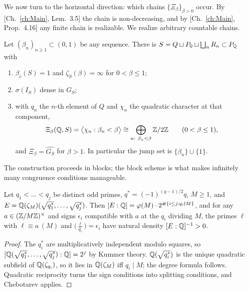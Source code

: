 We now turn to the horizontal direction: which chains $\{\Xi_\beta\}_{\beta>0}$ occur. By
[Ch.~\ref{ch:Main}, Lem.~3.5] the chain is non-decreasing, and by [Ch.~\ref{ch:Main}, Prop.~4.16] any
finite chain is realizable. We realize arbitrary countable chains.

\begin{theorem}[Realization]\label{I:thm:realize}
Let $(\beta_n)_{n\ge1}\subset(0,1)$ be any sequence. There is $S=Q\sqcup P_0\sqcup\bigsqcup_nR_n\subset P_{\mathbb{Q}}$
with
\begin{enumerate}
\item $\beta_c(S)=1$ and $\zeta_S(\beta)=\infty$ for $0<\beta\le1$;
\item $\sigma(I_S)$ dense in $G_S$;
\item with $q_n$ the $n$-th element of $Q$ and $\chi_n$ the quadratic character at that
component,
\[
\Xi_\beta(\Q,S)=\bigl\langle\chi_n:\beta_n<\beta\bigr\rangle\cong\bigoplus_{n:\ \beta_n<\beta}\Z/2\Z
\qquad(0<\beta\le1),
\]
and $\Xi_\beta=\widehat{G_S}$ for $\beta>1$. In particular the jump set is
$\{\beta_n\}\cup\{1\}$.
\end{enumerate}
\end{theorem}

The construction proceeds in blocks; the block scheme is what makes infinitely many
congruence conditions manageable.

\begin{lemma}\label{I:lem:disjoint}
Let $q_1<\dots<q_j$ be distinct odd primes, $q^*=(-1)^{(q-1)/2}q$, $M\ge1$, and
$E=\mathbb{Q}(\zeta_M)(\sqrt{q_1^*},\dots,\sqrt{q_j^*})$. Then
$[E:\mathbb{Q}]=\varphi(M)\cdot2^{\#\{i\le j:q_i\nmid M\}}$, and for any $a\in(\mathbb{Z}/M\mathbb{Z})^\times$ and
signs $\epsilon_i$ compatible with $a$ at the $q_i$ dividing $M$, the primes $\ell$ with
$\ell\equiv a\ (M)$ and $\bigl(\tfrac{\ell}{q_i}\bigr)=\epsilon_i$ have natural density
$[E:\mathbb{Q}]^{-1}>0$.
\end{lemma}

\begin{proof}
The $q_i^*$ are multiplicatively independent modulo squares, so
$[\mathbb{Q}(\sqrt{q_1^*},\dots,\sqrt{q_j^*}):\mathbb{Q}]=2^j$ by Kummer theory. $\mathbb{Q}(\sqrt{q_i^*})$ is the
unique quadratic subfield of $\mathbb{Q}(\zeta_{q_i})$, so it lies in $\mathbb{Q}(\zeta_M)$ iff $q_i\mid M$;
the degree formula follows. Quadratic reciprocity turns the sign conditions into splitting
conditions, and Chebotarev applies.
\end{proof}

